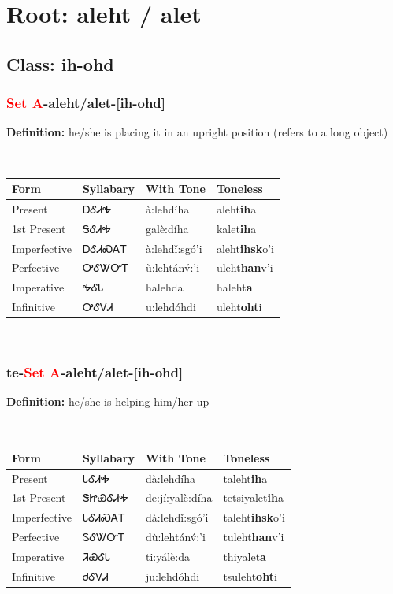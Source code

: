 \needspace{4in}
\section*{Root: aleht / alet}
\nopagebreak
{}
\needspace{3in}
\subsection*{Class: ih-ohd}
\nopagebreak
\needspace{2in}
\subsubsection*{\textcolor{Red}{Set A}{-}\textbf{aleht/alet}{-}[ih-ohd]}
\nopagebreak
\textbf{Definition: } he/she is placing it in an upright position (refers to a long object)
\\[0.5em]
\begin{tabularx}{\textwidth}{l X X X}%
\toprule%
\textbf{Form}&\textbf{Syllabary}&\textbf{With Tone}&\textbf{Toneless}\\%
\midrule%
Present&ᎠᎴᏗᎭ&à:lehdíha&aleht\textbf{ih}a\\%
1st Present&ᎦᎴᏗᎭ&galè:díha&kalet\textbf{ih}a\\%
Imperfective&ᎠᎴᏗᏍᎪᎢ&à:lehdǐ:sgó’i&aleht\textbf{ihsk}o'i\\%
Perfective&ᎤᎴᏔᏅᎢ&ù:lehtánv́:’i&uleht\textbf{han}v'i\\%
Imperative&ᎭᎴᏓ&halehda&haleht\textbf{a}\\%
Infinitive&ᎤᎴᏙᏗ&u:lehdóhdi&uleht\textbf{oht}i\\%
\bottomrule%
\end{tabularx}
\\[1em]
\needspace{2in}
\subsubsection*{te{-}\textcolor{Red}{Set A}{-}\textbf{aleht/alet}{-}[ih-ohd]}
\nopagebreak
\textbf{Definition: } he/she is helping him/her up
\\[0.5em]
\begin{tabularx}{\textwidth}{l X X X}%
\toprule%
\textbf{Form}&\textbf{Syllabary}&\textbf{With Tone}&\textbf{Toneless}\\%
\midrule%
Present&ᏓᎴᏗᎭ&dà:lehdíha&taleht\textbf{ih}a\\%
1st Present&ᏕᏥᏯᎴᏗᎭ&de:jí:yalè:díha&tetsiyalet\textbf{ih}a\\%
Imperfective&ᏓᎴᏗᏍᎪᎢ&dà:lehdǐ:sgó’i&taleht\textbf{ihsk}o'i\\%
Perfective&ᏚᎴᏔᏅᎢ&dù:lehtánv́:’i&tuleht\textbf{han}v'i\\%
Imperative&ᏘᏯᎴᏓ&ti:yálè:da&thiyalet\textbf{a}\\%
Infinitive&ᏧᎴᏙᏗ&ju:lehdóhdi&tsuleht\textbf{oht}i\\%
\bottomrule%
\end{tabularx}
\\[1em]